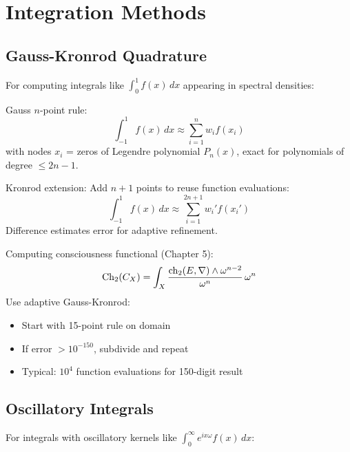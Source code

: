 \section{Integration Methods}
\label{sec:integration-methods}

\subsection{Gauss-Kronrod Quadrature}

For computing integrals like $\int_0^1 f(x)\,dx$ appearing in spectral densities:

\begin{defn}\label{def:gauss-kronrod}
Gauss $n$-point rule:
\begin{equation}
\int_{-1}^1 f(x)\,dx \approx \sum_{i=1}^n w_i f(x_i)
\end{equation}
with nodes $x_i$ = zeros of Legendre polynomial $P_n(x)$, exact for polynomials of degree $\leq 2n-1$.

Kronrod extension: Add $n+1$ points to reuse function evaluations:
\begin{equation}
\int_{-1}^1 f(x)\,dx \approx \sum_{i=1}^{2n+1} w_i' f(x_i')
\end{equation}
Difference estimates error for adaptive refinement.
\end{defn}

\begin{example}
Computing consciousness functional (Chapter 5):
\begin{equation}
\mathrm{Ch}_2(C_X) = \int_X \frac{\mathrm{ch}_2(E,\nabla) \wedge \omega^{n-2}}{\omega^n}\,\omega^n
\end{equation}
Use adaptive Gauss-Kronrod:
\begin{itemize}
\item Start with 15-point rule on domain
\item If error $> 10^{-150}$, subdivide and repeat
\item Typical: $10^4$ function evaluations for 150-digit result
\end{itemize}
\end{example}

\subsection{Oscillatory Integrals}

For integrals with oscillatory kernels like $\int_0^\infty e^{ix\omega} f(x)\,dx$:

